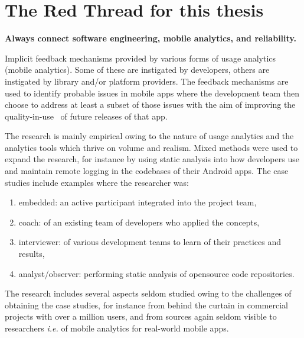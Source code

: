 \chapter{The Red Thread for this thesis}
\textbf{Always connect software engineering, mobile analytics, and reliability.}

Implicit feedback mechanisms provided by various forms of usage analytics (mobile analytics). Some of these are instigated by developers, others are instigated by library and/or platform providers. The feedback mechanisms are used to identify probable issues in mobile apps where the development team then choose to address at least a subset of those issues with the aim of improving the quality-in-use~\citep{} of future releases of that app. 

The research is mainly empirical owing to the nature of usage analytics and the analytics tools which thrive on volume and realism. Mixed methods were used to expand the research, for instance by using static analysis into how developers use and maintain remote logging in the codebases of their Android apps. The case studies include examples where the researcher was:
\begin{enumerate}
    \item embedded: an active participant integrated into the project team,
    \item coach: of an existing team of developers who applied the concepts,
    \item interviewer: of various development teams to learn of their practices and results,
    \item analyst/observer: performing static analysis of opensource code repositories.
\end{enumerate}

The research includes several aspects seldom studied owing to the challenges of obtaining the case studies, for instance from behind the curtain in commercial projects with over a million users, and from sources again seldom visible to researchers \emph{i.e.} of mobile analytics for real-world mobile apps.

\newpage

